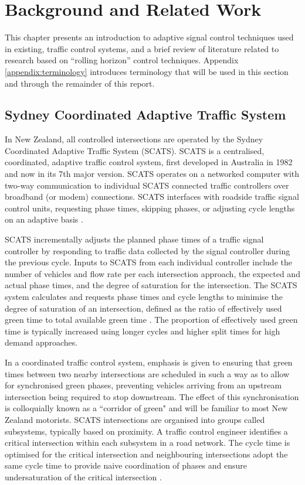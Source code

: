 \chapter{Background and Related Work}

This chapter presents an introduction to adaptive signal control techniques used in existing, traffic control systems, and a brief review of literature related to research based on ``rolling horizon'' control techniques. Appendix \ref{appendix:terminology} introduces terminology that will be used in this section and through the remainder of this report. 

\section{Sydney Coordinated Adaptive Traffic System}

In New Zealand, all controlled intersections are operated by the Sydney Coordinated Adaptive Traffic System (SCATS). SCATS is a centralised, coordinated, adaptive traffic control system, first developed in Australia in 1982 and now in its 7th major version. SCATS operates on a networked computer with two-way communication to individual SCATS connected traffic controllers over broadband (or modem) connections. SCATS interfaces with roadside traffic signal control units, requesting phase times, skipping phases, or adjusting cycle lengths on an adaptive basis \cite{scatstraining,lowrie1982scats}.

SCATS incrementally adjusts the planned phase times of a traffic signal controller by responding to traffic data collected by the signal controller during the previous cycle. Inputs to SCATS from each individual controller include the number of vehicles and flow rate per each intersection approach, the expected and actual phase times, and the degree of saturation for the intersection.  The SCATS system calculates and requests phase times and cycle lengths to minimise the degree of saturation of an intersection, defined as the ratio of effectively used green time to total available green time \cite{wolshon1999scats}. The proportion of effectively used green time is typically increased using longer cycles and higher split times for high demand approaches. 

In a coordinated traffic control system, emphasis is given to ensuring that green times between two nearby intersections are scheduled in such a way as to allow for synchronised green phases, preventing vehicles arriving from an upstream intersection being required to stop downstream. The effect of this synchronisation is colloquially known as a ``corridor of green" and will be familiar to most New Zealand motorists. SCATS intersections are organised into groups called subsystems, typically based on proximity. A traffic control engineer identifies a critical intersection within each subsystem in a road network. The cycle time is optimised for the critical intersection and neighbouring intersections adopt the same cycle time to provide naive coordination of phases and ensure undersaturation of the critical intersection \cite{kilby2010rta}.

